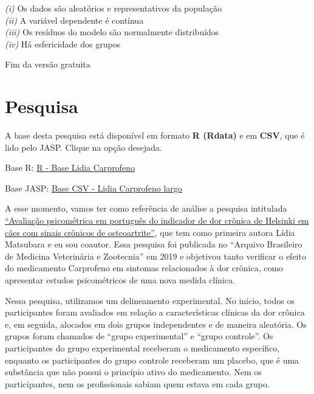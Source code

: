 \documentclass[
]{book}
\newenvironment{base}{
  \definecolor{shadecolor}{rgb}{0.764,0.992,0.686}  %
  \color{black}
  \begin{shaded}}
 {\end{shaded}}
\begin{document}
\emph{(i)} Os dados são aleatórios e representativos da população\\
\emph{(ii)} A variável dependente é contínua\\
\emph{(iii)} Os resíduos do modelo são normalmente distribuídos\\
\emph{(iv)} Há esfericidade dos grupos

Fim da versão gratuita

\hypertarget{pesquisa-6}{%
\section{Pesquisa}\label{pesquisa-6}}

\begin{base}
A base desta pesquisa está disponível em formato \textbf{R (Rdata)} e em \textbf{CSV}, que é lido pelo JASP. Clique na opção desejada.

Base R: \href{https://github.com/anovabr/mqt/raw/master/bases/R\%20-\%20Base\%20Lidia\%20Carprofeno.RData}{R - Base Lidia Carprofeno}

Base JASP: \href{https://github.com/anovabr/mqt/raw/master/bases/bases_csv_jasp.zip}{Base CSV - Lidia Carprofeno largo}

\end{base}

A esse momento, vamos ter como referência de análise a pesquisa intitulada \href{https://www.scielo.br/scielo.php?script=sci_arttext\&pid=S0102-09352019000100109}{``Avaliação psicométrica em português do indicador de dor crônica de Helsinki em cães com sinais crônicos de osteoartrite''}, que tem como primeira autora Lídia Matsubara e eu sou coautor. Essa pesquisa foi publicada no ``Arquivo Brasileiro de Medicina Veterinária e Zootecnia'' em 2019 e objetivou tanto verificar o efeito do medicamento Carprofeno em sintomas relacionados à dor crônica, como apresentar estudos psicométricos de uma nova medida clínica.

Nessa pesquisa, utilizamos um delineamento experimental. No início, todos os participantes foram avaliados em relação a características clínicas da dor crônica e, em seguida, alocados em dois grupos independentes e de maneira aleatória. Os grupos foram chamados de ``grupo experimental'' e ``grupo controle''. Os participantes do grupo experimental receberam o medicamento específico, enquanto os participantes do grupo controle receberam um placebo, que é uma substância que não possui o princípio ativo do medicamento. Nem os participantes, nem os profissionais sabiam quem estava em cada grupo.
\end{document}
